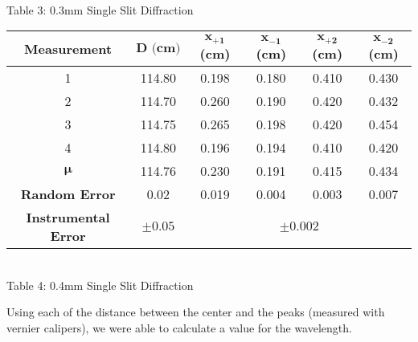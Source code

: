 \begin{center}
\begin{tabular}{|c|c|c c c c|}
    \end{tabular}
    \vspace{3mm}
    \\Table 3: 0.3mm Single Slit Diffraction\\
    \vspace{5mm}
    \begin{tabular}{|c|c|c c c c|}
        \hline
        \textbf{Measurement} & $\bm{D\textbf{ (cm)}}$ & $\bm{x_{+1}}$\textbf{(cm)} & $\bm{x_{-1}}$\textbf{(cm)} & $\bm{x_{+2}}$\textbf{(cm)} & $\bm{x_{-2}}$\textbf{(cm)}\\ \hline
        1                     & 114.80& 0.198 & 0.180  & 0.410 & 0.430 \\ 
        2                     & 114.70& 0.260 & 0.190  & 0.420 & 0.432 \\ 
        3                     & 114.75& 0.265 & 0.198  & 0.420 & 0.454 \\ 
        4                     & 114.80& 0.196 & 0.194  & 0.410 & 0.420 \\ \hline \hline
        $\bm{\mu}$            & 114.76& 0.230 & 0.191  & 0.415 & 0.434 \\ 
        \textbf{Random Error} & 0.02  & 0.019 & 0.004  & 0.003 & 0.007 \\ 
        \textbf{Instrumental Error} & $\pm 0.05$ & \multicolumn{4}{c|}{$\pm 0.002$} \\ \hline
    \end{tabular}
    \vspace{3mm}
    \\Table 4: 0.4mm Single Slit Diffraction\\
\end{center}
Using each of the distance between the center and the peaks (measured with vernier calipers), we were able to calculate a value for the wavelength.
\newpage
